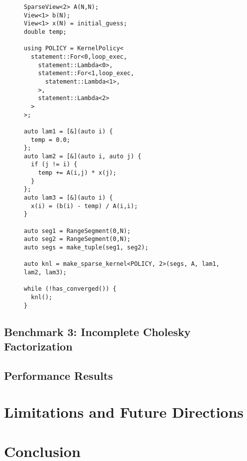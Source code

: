 \begin{figure}
\begin{lstlisting}[caption={\sparseraja{} version of Gauss-Seidel iteration},label=SparseRAJAGauSei]
SparseView<2> A(N,N);
View<1> b(N);
View<1> x(N) = initial_guess;
double temp;

using POLICY = KernelPolicy<
  statement::For<0,loop_exec,
    statement::Lambda<0>,
    statement::For<1,loop_exec,
      statement::Lambda<1>,
    >,
    statement::Lambda<2>
  >
>;

auto lam1 = [&](auto i) {
  temp = 0.0;
};
auto lam2 = [&](auto i, auto j) {
  if (j != i) {
    temp += A(i,j) * x(j);
  }
};
auto lam3 = [&](auto i) {
  x(i) = (b(i) - temp) / A(i,i);
}

auto seg1 = RangeSegment(0,N);
auto seg2 = RangeSegment(0,N);
auto segs = make_tuple(seg1, seg2);

auto knl = make_sparse_kernel<POLICY, 2>(segs, A, lam1, lam2, lam3);

while (!has_converged()) {
  knl();
}
\end{lstlisting}
\end{figure}

\subsection{Benchmark 3: Incomplete Cholesky Factorization}






\subsection{Performance Results}



\section{Limitations and Future Directions}

\section{Conclusion}





